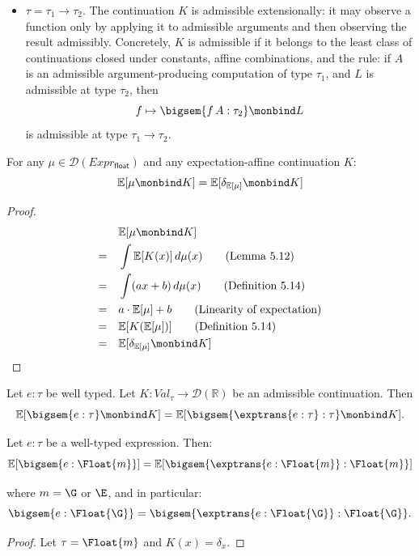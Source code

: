 \begin{definition}
\begin{itemize}
    \item \(\tau = \tau_1 \to \tau_2\). The continuation \(K\) is admissible
    extensionally: it may observe a function only by applying it to admissible
    arguments and then observing the result admissibly. Concretely, \(K\) is
    admissible if it belongs to the least class of continuations closed under
    constants, affine combinations, and the rule:
    if \(A\) is an admissible argument-producing computation of type
    \(\tau_1\), and \(L\) is admissible at type \(\tau_2\), then
    \[
      f \mapsto \bigsem{f\,A : \tau_2} \monbind L
    \]
    is admissible at type \(\tau_1 \to \tau_2\).
  \end{itemize}
\end{definition}


\begin{lemma}
  For any $\mu \in \mathcal{D}(Expr_\mathsf{float})$ and any expectation-affine continuation $K$:
  \[
    \mathbb{E}[\mu \monbind K] = \mathbb{E}[\delta_{\mathbb{E}[\mu]} \monbind K]
  \]
\end{lemma}

\begin{proof}
  \begin{align*}
    &\mathbb{E}[\mu \monbind K] \\
    = \quad&\int \mathbb{E}[K(x)] \, d\mu(x) \tag{Lemma 5.12} \\
    = \quad&\int (ax + b) \, d\mu(x) \tag{Definition 5.14} \\
    = \quad&a \cdot \mathbb{E}[\mu] + b \tag{Linearity of expectation} \\
    = \quad&\mathbb{E}[K(\mathbb{E}[\mu])] \tag{Definition 5.14} \\
    = \quad&\mathbb{E}[\delta_{\mathbb{E}[\mu]} \monbind K] 
  \end{align*}
\end{proof}

\begin{theorem}
  Let $e : \tau$ be well typed. Let
  $K : Val_\tau \to \mathcal{D}(\mathbb{R})$
  be an admissible continuation. Then
  \[
    \mathbb{E}[\bigsem{e : \tau} \monbind K]
    =
    \mathbb{E}[\bigsem{\exptrans{e : \tau} : \tau} \monbind K].
  \]
\end{theorem}

\begin{theorem}
  Let $e : \tau$ be a well-typed expression. Then:
  \[
    \mathbb{E}[\bigsem{e : \Float{m}}]
    =
    \mathbb{E}[\bigsem{\exptrans{e : \Float{m}} : \Float{m}}]
  \]

  where $m = \G$ or $\E$, and in particular:
  \[
    \bigsem{e : \Float{\G}}
    =
    \bigsem{\exptrans{e : \Float{\G}} : \Float{\G}}.
  \]
\end{theorem}

\begin{proof}
  Let $\tau = \Float{m}$ and $K(x) = \delta_x$. 
\end{proof}
